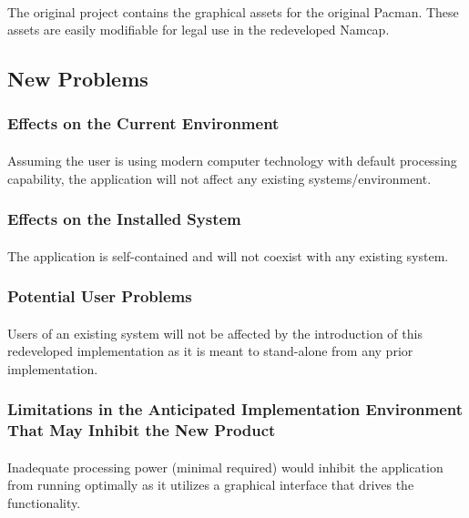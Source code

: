 \documentclass[12pt, titlepage]{article}
\begin{document}
\paragraph{}
The original project contains the graphical assets for the original Pacman. These assets are easily modifiable for legal use in the redeveloped Namcap.

\subsection{New Problems}

\subsubsection{Effects on the Current Environment}
\paragraph{}
Assuming the user is using modern computer technology with default processing capability, the application will not affect any existing systems/environment.

\subsubsection{Effects on the Installed System}
\paragraph{}
The application is self-contained and will not coexist with any existing system.

\subsubsection{Potential User Problems}
\paragraph{}
Users of an existing system will not be affected by the introduction of this redeveloped implementation as it is meant to stand-alone from any prior implementation.

\subsubsection{Limitations in the Anticipated Implementation Environment That May Inhibit the New Product}
\paragraph{}
Inadequate processing power (minimal required) would inhibit the application from running optimally as it utilizes a graphical interface that drives the functionality.
\end{document}
